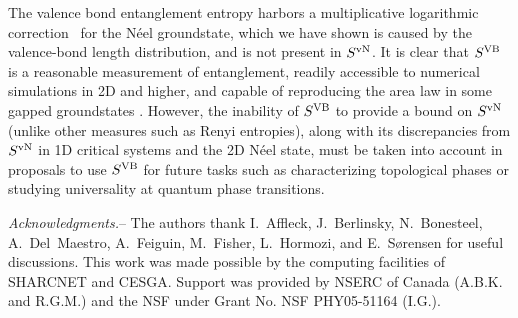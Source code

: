 \documentclass[prl,aps,twocolumn,floatfix,amsmath,amssymb,superscriptaddress,tightenlines]{revtex4}
\begin{document}
The valence bond entanglement entropy harbors a multiplicative logarithmic
correction~\cite{Alet,Chh} for the N\'eel groundstate, which we have shown
is caused by the valence-bond length distribution, and is not present in
$S^{\rm vN}$.  It is clear that $S^{\rm VB}$ is a reasonable
measurement of entanglement, readily accessible to numerical simulations
in 2D and higher, and capable of reproducing the area law in some gapped
groundstates \cite{Alet,Chh}.  However, the inability of  $S^{\rm VB}$ to
provide a bound on $S^{\rm vN}$ (unlike other measures such as Renyi
entropies), along with its discrepancies from $S^{\rm vN}$ in 1D critical
systems and the 2D N\'eel state, must be taken into account in proposals
to use $S^{\rm VB}$ for
future tasks such as characterizing topological phases or studying
universality at quantum phase transitions.


{\it Acknowledgments.}-- The authors thank I.~Affleck, J.~Berlinsky,
N.~Bonesteel, A.~Del~Maestro, A.~Feiguin, 
M.~Fisher, L.~Hormozi, and E.~S\o rensen 
for useful discussions.  This work was made possible by the
computing facilities of SHARCNET and CESGA.  Support was provided by NSERC
of Canada (A.B.K. and R.G.M.) and the NSF under Grant No. NSF PHY05-51164
(I.G.).


\end{document}
